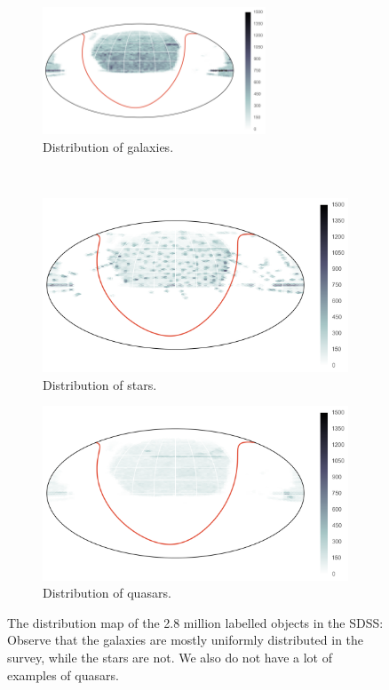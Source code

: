 \begin{figure}[p]
	\centering
	\begin{subfigure}{\textwidth}
		\centering
		\includegraphics[width=0.73\textwidth]{figures/4_expt1/sdss_train_galaxies}
		\caption{Distribution of galaxies.}
		\label{fig:training_g}
	\end{subfigure}\\
	\begin{subfigure}{\textwidth}
		\centering
		\includegraphics[width=0.73\linewidth]{figures/4_expt1/sdss_train_stars}
		\caption{Distribution of stars.}
		\label{fig:training_s}
	\end{subfigure}
	\begin{subfigure}{\textwidth}
		\centering
		\includegraphics[width=0.73\linewidth]{figures/4_expt1/sdss_train_quasars}
		\caption{Distribution of quasars.}
		\label{fig:training_q}
	\end{subfigure}
	\caption[Distribution map of labelled objects in the SDSS]{The distribution map of
		the 2.8 million labelled objects in the SDSS: Observe that the
		galaxies are mostly uniformly distributed in the survey, while the stars are not.
		We also do not have a lot of examples of quasars.}
	\label{fig:training_dist}
\end{figure}


